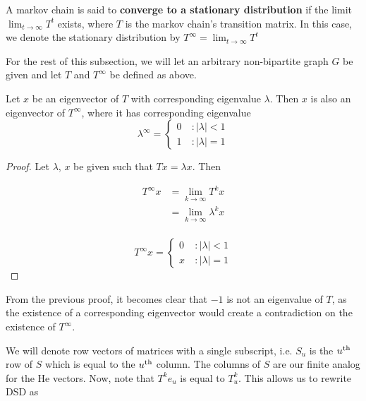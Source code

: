 \begin{definition}
  A markov chain is said to \textbf{converge to a stationary distribution} if the limit
  $\lim_{t \to \infty}T^t$ exists, where $T$ is the markov chain's transition matrix. In this case,
  we denote the stationary distribution by $T^\infty = \lim_{t \to \infty}T^t$
\end{definition}

For the rest of this subsection, we will let an arbitrary non-bipartite graph $G$ be given and let
$T$ and $T^{\infty}$ be defined as above.


\begin{proposition}
  Let $x$ be an eigenvector of $T$ with corresponding eigenvalue $\lambda$. Then $x$ is also
  an eigenvector of $T^{\infty}$, where it has corresponding eigenvalue
  \[
    \lambda^{\infty} = \begin{cases}
      0 &~: |\lambda| < 1 \\
      1 &~: |\lambda| = 1
    \end{cases}
  \]
\end{proposition}

\begin{proof}
  Let $\lambda$, $x$ be given such that $Tx = \lambda x$. Then

  \begin{align*}
    T^{\infty}x &= \lim_{k\to\infty}T^k x \\
               &= \lim_{k\to\infty}\lambda^k x \\
  \end{align*}

  \[ T^{\infty}x = \begin{cases}
      0 &~: |\lambda| < 1 \\
      x &~: |\lambda| = 1
    \end{cases}
  \]
\end{proof}

\begin{corollary}
  From the previous proof, it becomes clear that $-1$ is not an eigenvalue of $T$, as the existence
  of a corresponding eigenvector would create a contradiction on the existence of $T^{\infty}$.
\end{corollary}


We will denote row vectors of matrices with a single subscript, i.e. $S_u$ is
the $u^{\mathrm{th}}$ row of $S$ which is equal to the $u^{\mathrm{th}}$ column. The columns of $S$
are our finite analog for the $\mathrm{He}$ vectors. Now, note that $T^ke_u$ is
equal to $T^k_u$. This allows us to rewrite DSD as

